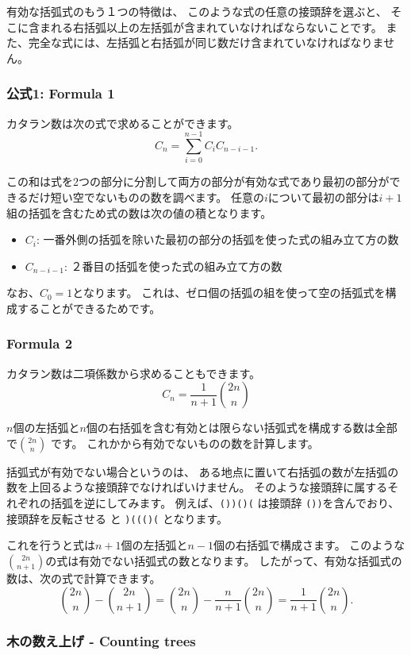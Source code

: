 有効な括弧式のもう１つの特徴は、
このような式の任意の接頭辞を選ぶと、
そこに含まれる右括弧以上の左括弧が含まれていなければならないことです。
また、完全な式には、左括弧と右括弧が同じ数だけ含まれていなければなりません。

\subsubsection{公式1: Formula 1}

カタラン数は次の式で求めることができます。
\[ C_n = \sum_{i=0}^{n-1} C_{i} C_{n-i-1}.\]

この和は式を2つの部分に分割して両方の部分が有効な式であり最初の部分ができるだけ短い空でないものの数を調べます。
任意の$i$について最初の部分は$i + 1$組の括弧を含むため式の数は次の値の積となります。

\begin{itemize}
\item $C_{i}$: 一番外側の括弧を除いた最初の部分の括弧を使った式の組み立て方の数
\item $C_{n-i-1}$: ２番目の括弧を使った式の組み立て方の数
\end{itemize}

なお、$C_0=1$となります。
これは、ゼロ個の括弧の組を使って空の括弧式を構成することができるためです。

\subsubsection{Formula 2}

カタラン数は二項係数から求めることもできます。
\[ C_n = \frac{1}{n+1} {2n \choose n}\]

$n$個の左括弧と$n$個の右括弧を含む有効とは限らない括弧式を構成する数は全部で${2n \choose n}$ です。
これかから有効でないものの数を計算します。

括弧式が有効でない場合というのは、
ある地点に置いて右括弧の数が左括弧の数を上回るような接頭辞でなければいけません。
そのような接頭辞に属するそれぞれの括弧を逆にしてみます。
例えば、\texttt{())()(} は接頭辞 \texttt{())}を含んでおり、
接頭辞を反転させる と \texttt{)((()(} となります。

これを行うと式は$n + 1$個の左括弧と$n - 1$個の右括弧で構成さます。
このような${2n \choose n+1}$の式は有効でない括弧式の数となります。
したがって、有効な括弧式の数は、次の式で計算できます。
\[{2n \choose n}-{2n \choose n+1} = {2n \choose n} - \frac{n}{n+1} {2n \choose n} = \frac{1}{n+1} {2n \choose n}.\]

\subsubsection{木の数え上げ - Counting trees}

